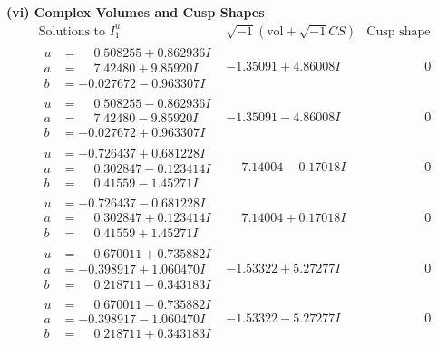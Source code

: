 \documentclass[1p]{elsarticle_modified}
\theoremstyle{definition}
\newcommand{\I}{\sqrt{-1}}
\begin{document}
\newpage\flushleft \textbf{(vi) Complex Volumes and Cusp Shapes}
$$\begin{array}{c|c|c}  
\text{Solutions to }I^u_{1}& \I (\text{vol} + \sqrt{-1}CS) & \text{Cusp shape}\\
 \hline 
\begin{aligned}
u &= \phantom{-}0.508255 + 0.862936 I \\
a &= \phantom{-}7.42480 + 9.85920 I \\
b &= -0.027672 - 0.963307 I\end{aligned}
 & -1.35091 + 4.86008 I & \phantom{-0.000000 } 0 \\ \hline\begin{aligned}
u &= \phantom{-}0.508255 - 0.862936 I \\
a &= \phantom{-}7.42480 - 9.85920 I \\
b &= -0.027672 + 0.963307 I\end{aligned}
 & -1.35091 - 4.86008 I & \phantom{-0.000000 } 0 \\ \hline\begin{aligned}
u &= -0.726437 + 0.681228 I \\
a &= \phantom{-}0.302847 - 0.123414 I \\
b &= \phantom{-}0.41559 - 1.45271 I\end{aligned}
 & \phantom{-}7.14004 - 0.17018 I & \phantom{-0.000000 } 0 \\ \hline\begin{aligned}
u &= -0.726437 - 0.681228 I \\
a &= \phantom{-}0.302847 + 0.123414 I \\
b &= \phantom{-}0.41559 + 1.45271 I\end{aligned}
 & \phantom{-}7.14004 + 0.17018 I & \phantom{-0.000000 } 0 \\ \hline\begin{aligned}
u &= \phantom{-}0.670011 + 0.735882 I \\
a &= -0.398917 + 1.060470 I \\
b &= \phantom{-}0.218711 - 0.343183 I\end{aligned}
 & -1.53322 + 5.27277 I & \phantom{-0.000000 } 0 \\ \hline\begin{aligned}
u &= \phantom{-}0.670011 - 0.735882 I \\
a &= -0.398917 - 1.060470 I \\
b &= \phantom{-}0.218711 + 0.343183 I\end{aligned}
 & -1.53322 - 5.27277 I & \phantom{-0.000000 } 0 \\ \hline\begin{aligned}

\end{aligned}
\end{array}$$
\end{document}
